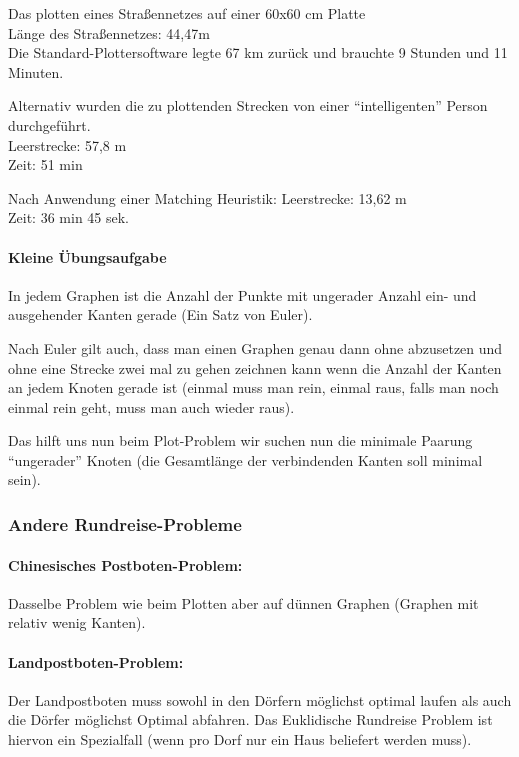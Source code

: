 Das plotten eines Straßennetzes auf einer 60x60 cm Platte\\
Länge des Straßennetzes: 44,47m\\
Die Standard-Plottersoftware legte 67 km zurück und brauchte 9 Stunden und
11 Minuten.

Alternativ wurden die zu plottenden Strecken von einer "`intelligenten"'
Person durchgeführt.\\
Leerstrecke: 57,8 m\\
Zeit: 51 min

Nach Anwendung einer Matching Heuristik:
Leerstrecke: 13,62 m\\
Zeit: 36 min 45 sek.

\paragraph{Kleine Übungsaufgabe} In jedem Graphen ist die Anzahl der Punkte
mit ungerader Anzahl ein- und ausgehender Kanten gerade (Ein Satz von Euler). 

Nach Euler gilt auch, dass man einen Graphen genau dann ohne abzusetzen
und ohne eine Strecke zwei mal zu gehen zeichnen kann wenn die Anzahl der
Kanten an jedem Knoten gerade ist (einmal muss man rein, einmal raus,
falls man noch einmal rein geht, muss man auch wieder raus).

Das hilft uns nun beim Plot-Problem wir suchen nun die minimale Paarung
"`ungerader"' Knoten (die Gesamtlänge der verbindenden Kanten soll minimal
sein).

\subsubsection{Andere Rundreise-Probleme}

\paragraph{Chinesisches Postboten-Problem:} Dasselbe Problem wie beim
Plotten aber auf dünnen Graphen (Graphen mit relativ wenig Kanten).

\paragraph{Landpostboten-Problem:} Der Landpostboten muss sowohl in den
Dörfern möglichst optimal laufen als auch die Dörfer möglichst Optimal
abfahren. Das Euklidische Rundreise Problem ist hiervon ein Spezialfall
(wenn pro Dorf nur ein Haus beliefert werden muss).

